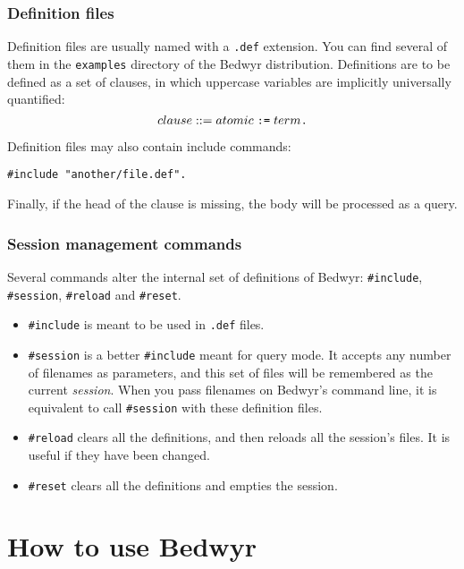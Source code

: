 \documentclass{article}
\begin{document}
\subsubsection{Definition files}

Definition files are usually named with a \verb|.def| extension.
You can find several of them in the \verb.examples. directory
of the Bedwyr distribution.
Definitions are to be defined as a set of clauses, in which uppercase
variables are implicitly universally quantified:
\[ clause ::= atomic \;\verb.:=.\; term \verb|.| \]

Definition files may also contain include commands:
\begin{verbatim}#include "another/file.def".\end{verbatim}

Finally, if the head of the clause is missing, the body will be processed as a 
query.

\subsubsection{Session management commands}

Several commands alter the internal set of definitions of Bedwyr:
\verb.#include., \verb.#session., \verb.#reload. and \verb.#reset..
\begin{itemize}
  \item
    \verb.#include. is meant to be used in \verb;.def; files.
  \item
    \verb.#session. is a better \verb.#include. meant for query mode.
    It accepts any number of filenames as parameters, and this set of files
    will be remembered as the current \emph{session}.
    When you pass filenames on Bedwyr's command line,
    it is equivalent to call \verb.#session. with these definition files.
  \item
    \verb.#reload. clears all the definitions,
    and then reloads all the session's files. It is useful if they have 
    been changed.
  \item
    \verb.#reset. clears all the definitions and empties the session.
\end{itemize}

\section{How to use Bedwyr}
\label{sec:howto}
\end{document}
